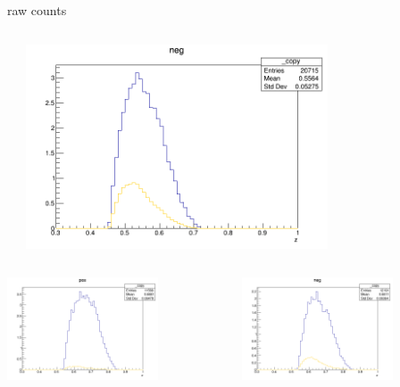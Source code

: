 \begin{frame}{raw counts}
\begin{columns}
\begin{column}[T]{0.25\textwidth}
\end{column}
\begin{column}[T]{0.25\textwidth}
\includegraphics[width = 0.7\textwidth]{results/yield/statistics/yield_x_Q2_z_0.60_5.500_0.55_neg.png}
\end{column}
\end{columns}
\begin{columns}
\begin{column}[T]{0.25\textwidth}
\includegraphics[width = 0.7\textwidth]{results/yield/statistics/yield_x_Q2_z_0.60_5.500_0.65_pos.png}
\end{column}
\begin{column}[T]{0.25\textwidth}
\includegraphics[width = 0.7\textwidth]{results/yield/statistics/yield_x_Q2_z_0.60_5.500_0.65_neg.png}

\end{column}
\end{columns}
\end{frame}

